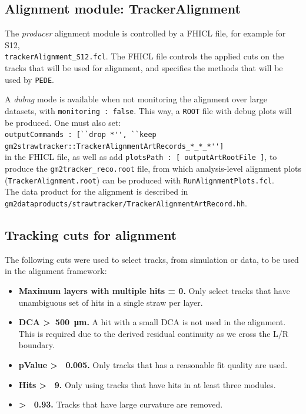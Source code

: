 \documentclass[12pt]{article}
\begin{document}
\subsection{Alignment module: TrackerAlignment} \label{sub:alignment_module}
The \textit{producer} alignment module is controlled by a FHICL file, for example for S12, \\\verb!trackerAlignment_S12.fcl!. The FHICL file controls the applied cuts on the tracks that will be used for alignment, and specifies the methods that will be used by \texttt{PEDE}.

A \textit{dubug} mode is available when not monitoring the alignment over large datasets, with \verb!monitoring : false!. This way, a \verb!ROOT! file with debug plots will be produced. One must also set: \\
\lstinline{outputCommands : [``drop *'', ``keep gm2strawtracker::TrackerAlignmentArtRecords_*_*_*'']} \\
in the FHICL file, as well as add \lstinline{plotsPath : [ outputArtRootFile ]}, to produce the \verb!gm2tracker_reco.root! file, from which analysis-level alignment plots \\ (\verb!TrackerAlignment.root!) can be produced with \verb!RunAlignmentPlots.fcl!. \\The data product for the alignment is described in \\ \verb!gm2dataproducts/strawtracker/TrackerAlignmentArtRecord.hh!.   

\subsection{Tracking cuts for alignment}
The following cuts were used to select tracks, from simulation or data, to be used in the alignment framework:
\begin{itemize}\setlength\itemsep{0.05em}\small
    \item \textbf{Maximum layers with multiple hits = 0.} Only select tracks that have unambiguous set of hits in a single straw per layer. 
    \item \textbf{DCA \textgreater~\SI{500}{\micro\metre}.} A hit with a small DCA is not used in the alignment. This is required due to the derived residual continuity as we cross the L/R boundary.
    \item \textbf{pValue \textgreater~ 0.005.} Only tracks that has a reasonable fit quality are used. 
    \item \textbf{Hits \textgreater~ 9.} Only using tracks that have hits in at least three modules. 
    \item \textbf{ \textgreater~ 0.93.} Tracks that have large curvature are removed.
\end{itemize}
\end{document}

